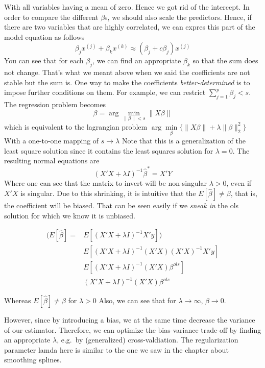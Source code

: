 \documentclass[]{book}
\begin{document}
With all variables having a mean of zero. Hence we got rid of the
intercept. In order to compare the different \(\beta\)s, we should also
scale the predictors. Hence, if there are two variables that are highly
correlated, we can expres this part of the model equation as follows
\[ \beta_j x^{(j)} + \beta_k x^{(k)} \approx (\beta_j + c \beta_j ) x^{(j)}\]
You can see that for each \(\beta_j\), we can find an appropriate
\(\beta_k\) so that the sum does not change. That's what we meant above
when we said the coefficients are not stable but the sum is. One way to
make the coefficients \emph{better-determined} is to impose further
conditions on them. For example, we can restrict
\(\sum\limits_{j = 1}^p \beta_j < s\). The regression problem becomes
\[\beta = \arg\min\limits_{\|\beta\| < s}\|X\beta\|\] which is
equivalent to the lagrangian problem
\(\arg\min\limits_{\beta} \{ \|X \beta \|+ \lambda \| \beta \|_2^2 \}\)
With a one-to-one mapping of \(s \rightarrow \lambda\) Note that this is
a generalization of the least square solution since it contains the
least squares solution for \(\lambda = 0\). The resulting normal
equations are \[(X'X + \lambda I)^{-1}\hat{\beta}^* = X'Y\] Where one
can see that the matrix to invert will be non-singular \(\lambda > 0\),
even if \(X'X\) is singular. Due to this shrinking, it is intuitive that
the \(E[\hat{\beta}] \neq \beta\), that is, the coefficient will be
biased. That can be seen easily if we \emph{sneak in} the ols solution
for which we know it is unbiased.

\begin{equation}
\begin{split}

(E[\hat{\beta}] = & E[(X'X + \lambda I)^{-1}X'y]) \\
& E[(X'X + \lambda I)^{-1} (X'X)(X'X)^{-1}X'y] \\
& E[(X'X + \lambda I)^{-1} (X'X)\beta^{ols}] \\
& (X'X + \lambda I)^{-1} (X'X)\beta^{ols}
\end{split}
\end{equation}

Whereas \(E[\hat{\beta}] \neq \beta\) for \(\lambda > 0\) Also, we can
see that for \(\lambda \rightarrow \infty\), \(\beta \rightarrow 0\).

However, since by introducing a bias, we at the same time decrease the
variance of our estimator. Therefore, we can optimize the bias-variance
trade-off by finding an appropriate \(\lambda\), e.g.~by (generalized)
cross-valdiation. The regularization parameter lamda here is similar to
the one we saw in the chapter about smoothing splines.
\end{document}
